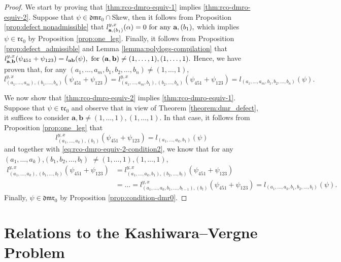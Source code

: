 \documentclass[a4paper,fleqn]{cas-sc}
\begin{document}
\begin{proof}
We start by proving that \eqref{thm:rco-dmro-equiv-1} implies \eqref{thm:rco-dmro-equiv-2}. Suppose that $\psi \in \mathfrak{dmr}_0 \cap$Skew, then it follows from Proposition \ref{prop:defect nonadmissible} that
$
	   l^{y,x}_{{\bf{a}},(b_1)}(\alpha)=0 \text{ for any } \textbf{a},(b_1), 
$
which implies $\psi\in \mathfrak{rc}_0$ by Proposition \ref{prop:one_leg}. Finally, it follows from Proposition \ref{prop:defect_admissible} and Lemma \ref{lemma:polylogs-compilation} that
$
	l^{y,x}_{\bf{a},\bf{b}}(\psi_{451}+\psi_{123})=l_{\bf{a}\bf{b}}(\psi), \text{ for } ({\bf{a} ,\bf{b}})\ne (1,\dots,1),(1,\dots,1).
$
Hence, we have proven that, for any $(a_1,\dots,a_m,b_1,b_2,\dots,b_n)\ne (1,\dots,1)$,
$$
    l^{y,x}_{(a_1,\dots,a_m),(b_1,\dots,b_n)}(\psi_{451}+\psi_{123}) =l^{y,x}_{(a_1,\dots,a_m,b_1),(b_2,\dots,b_n)}(\psi_{451}+\psi_{123})
	=l_{(a_1,\dots,a_m,b_1,b_2,\dots,b_n)}(\psi).
$$


We now show that \eqref{thm:rco-dmro-equiv-2} implies \eqref{thm:rco-dmro-equiv-1}. Suppose that $\psi\in \mathfrak{rc}_0$ and observe that in view of Theorem \ref{theorem:dmr_defect}, it suffices to consider $\textbf{a},\textbf{b} \neq (1, \ldots, 1),(1, \ldots, 1).$ In that case, it follows from Proposition \ref{prop:one_leg} that
$$
	l^{y,x}_{(a_1,\dots,a_k),(b_1)}(\psi_{451}+\psi_{123})=l_{(a_1,\dots,a_k,b_1)}(\psi)
$$
and together with \eqref{eq:rco-dmro-equiv-2-condition2}, we know that for any $(a_1,\dots,a_k)$,$(b_1,b_2,\dots,b_l)$ $\ne (1,\dots,1)$,$(1,\dots,1)$,
\begin{equation*}
\begin{split}
	l^{y,x}_{(a_1,\dots,a_k),(b_1,\dots,b_l)}(\psi_{451}+\psi_{123}) & = l^{y,x}_{(a_1,\dots,a_k, b_1),(b_2,\dots,b_l)}(\psi_{451}+\psi_{123}) \\
    &  = \ldots = l^{y,x}_{(a_1,\dots,a_k, b_1, \ldots, b_{l-1}),(b_l)}(\psi_{451}+\psi_{123}) 
    = l_{(a_1,\dots,a_k,b_1,b_2,\dots,b_l)}(\psi).
\end{split}
\end{equation*}
 Finally, $\psi\in \mathfrak{dmr}_0$ by Proposition \ref{prop:condition-dmr0}.
\end{proof}


\section{Relations to the Kashiwara--Vergne Problem}
\label{sec:Kashiwara--Vergne}
\end{document}
